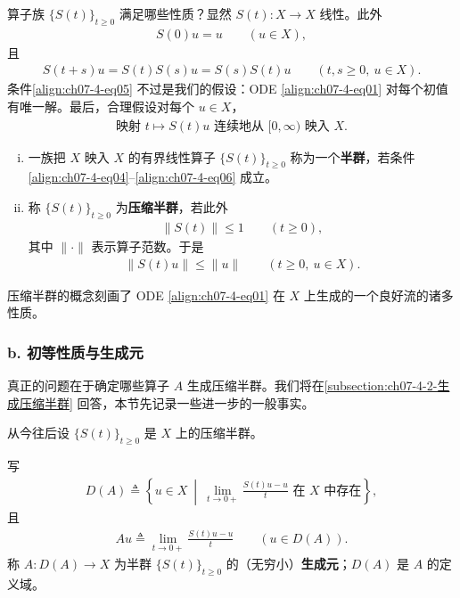 \documentclass[../../main.tex]{subfiles}
\begin{document}
算子族 $\{S(t)\}_{t\geqslant 0}$ 满足哪些性质？显然 $S(t):X\to X$ 线性。此外
\begin{align}
S(0)u=u\qquad (u\in X),\label{align:ch07-4-eq04}
\end{align}
且
\begin{align}
S(t+s)u=S(t)S(s)u=S(s)S(t)u\qquad (t,s\geqslant 0,\ u\in X).\label{align:ch07-4-eq05}
\end{align}
条件\eqref{align:ch07-4-eq05} 不过是我们的假设：ODE \eqref{align:ch07-4-eq01} 对每个初值有唯一解。最后，合理假设对每个 $u\in X$，
\begin{align}
\text{映射 } t\mapsto S(t)u \text{ 连续地从 } [0,\infty) \text{ 映入 } X.\label{align:ch07-4-eq06}
\end{align}

\begin{definition}\label{definition:ch07-4-半群}
\begin{enumerate}[(i)]
\item 一族把 $X$ 映入 $X$ 的有界线性算子 $\{S(t)\}_{t\geqslant 0}$ 称为一个\textbf{半群}，若条件\eqref{align:ch07-4-eq04}--\eqref{align:ch07-4-eq06} 成立。
\item 称 $\{S(t)\}_{t\geqslant 0}$ 为\textbf{压缩半群}，若此外
\begin{align}
\|S(t)\|\leqslant 1\qquad (t\geqslant 0),\label{align:ch07-4-eq07}
\end{align}
其中 $\|\cdot\|$ 表示算子范数。于是
\begin{align*}
\|S(t)u\|\leqslant\|u\|\qquad (t\geqslant 0,\ u\in X).
\end{align*}
\end{enumerate}
\end{definition}

压缩半群的概念刻画了 ODE \eqref{align:ch07-4-eq01} 在 $X$ 上生成的一个良好流的诸多性质。

\subsubsection*{b. 初等性质与生成元}

真正的问题在于确定哪些算子 $A$ 生成压缩半群。我们将在\cref{subsection:ch07-4-2-生成压缩半群} 回答，本节先记录一些进一步的一般事实。

从今往后设 $\{S(t)\}_{t\geqslant 0}$ 是 $X$ 上的压缩半群。

\begin{definition}\label{definition:ch07-4-无穷小生成元}
写
\begin{align}
D(A)\triangleq \left\{u\in X\ \middle|\ \lim_{t\to 0+}\frac{S(t)u-u}{t}\text{ 在 } X \text{ 中存在}\right\},\label{align:ch07-4-eq08}
\end{align}
且
\begin{align}
Au\triangleq \lim_{t\to 0+}\frac{S(t)u-u}{t}\qquad (u\in D(A)).\label{align:ch07-4-eq09}
\end{align}
称 $A:D(A)\to X$ 为半群 $\{S(t)\}_{t\geqslant 0}$ 的（无穷小）\textbf{生成元}；$D(A)$ 是 $A$ 的定义域。
\end{definition}
\end{document}
